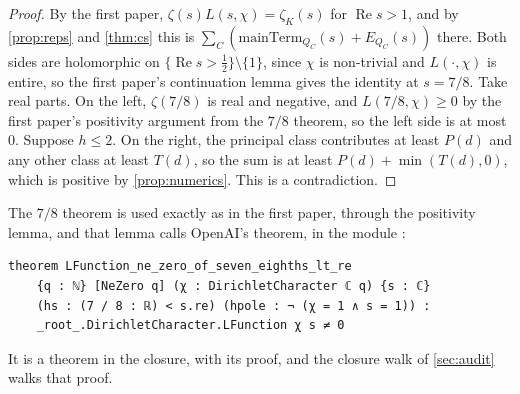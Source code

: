 \documentclass[11pt]{article}
\theoremstyle{definition}
\newcommand{\re}{\operatorname{Re}}
\begin{document}
{\begin{proof}
By the first paper, $\zeta(s)L(s,\chi) = \zeta_K(s)$ for $\re s > 1$, and by \cref{prop:reps} and \cref{thm:cs} this is $\sum_C(\mathrm{mainTerm}_{Q_C}(s) + E_{Q_C}(s))$ there. Both sides are holomorphic on $\{\re s > \frac12\} \setminus \{1\}$, since $\chi$ is non-trivial and $L(\cdot,\chi)$ is entire, so the first paper's continuation lemma gives the identity at $s = 7/8$. Take real parts. On the left, $\zeta(7/8)$ is real and negative, and $L(7/8,\chi) \ge 0$ by the first paper's positivity argument from the $7/8$ theorem, so the left side is at most $0$. Suppose $h \le 2$. On the right, the principal class contributes at least $P(d)$ and any other class at least $T(d)$, so the sum is at least $P(d) + \min(T(d), 0)$, which is positive by \cref{prop:numerics}. This is a contradiction.
\end{proof}

The $7/8$ theorem is used exactly as in the first paper, through the positivity lemma, and that lemma calls OpenAI's theorem, in the module :
\begin{lstlisting}
theorem LFunction_ne_zero_of_seven_eighths_lt_re
    {q : ℕ} [NeZero q] (χ : DirichletCharacter ℂ q) {s : ℂ}
    (hs : (7 / 8 : ℝ) < s.re) (hpole : ¬ (χ = 1 ∧ s = 1)) :
    _root_.DirichletCharacter.LFunction χ s ≠ 0
\end{lstlisting}
It is a theorem in the closure, with its proof, and the closure walk of \cref{sec:audit} walks that proof.

}
\end{document}
